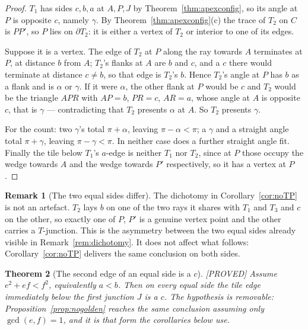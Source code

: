 \documentclass[11pt,reqno]{amsart}
\theoremstyle{plain}
\newtheorem{theorem}{Theorem}
\theoremstyle{definition}
\newtheorem{remark}[theorem]{Remark}
\newcommand{\lab}[1]{\hfill\textnormal{\footnotesize\textsc{[#1]}}}
\begin{document}
\begin{proof}
$T_1$ has sides $c,b,a$ at $A,P,J$ by Theorem~\ref{thm:apexconfig}, so its angle at $P$ is opposite
$c$, namely $\gamma$. By Theorem~\ref{thm:apexconfig}(c) the trace of $T_2$ on $C$ is $PP'$, so $P$
lies on $\partial T_2$: it is either a vertex of $T_2$ or interior to one of its edges.

Suppose it is a vertex. The edge of $T_2$ at $P$ along the ray towards $A$ terminates at $P$, at
distance $b$ from $A$; $T_2$'s flanks at $A$ are $b$ and $c$, and a $c$ there would terminate at
distance $c\ne b$, so that edge is $T_2$'s $b$. Hence $T_2$'s angle at $P$ has $b$ as a flank and is
$\alpha$ or $\gamma$. If it were $\alpha$, the other flank at $P$ would be $c$ and $T_2$ would be the
triangle $APR$ with $AP=b$, $PR=c$, $AR=a$, whose angle at $A$ is opposite $c$, that is $\gamma$ ---
contradicting that $T_2$ presents $\alpha$ at $A$. So $T_2$ presents $\gamma$.

For the count: two $\gamma$'s total $\pi+\alpha$, leaving $\pi-\alpha<\pi$; a $\gamma$ and a straight
angle total $\pi+\gamma$, leaving $\pi-\gamma<\pi$. In neither case does a further straight angle fit.
Finally the tile below $T_1$'s $a$-edge is neither $T_1$ nor $T_2$, since at $P$ those occupy the
wedge towards $A$ and the wedge towards $P'$ respectively, so it has a vertex at $P$.
\end{proof}

\begin{remark}[The two equal sides differ]\label{rem:twosides}
The dichotomy in Corollary~\ref{cor:noTP} is not an artefact. $T_2$ lays $b$ on one of the two rays it
shares with $T_1$ and $T_3$ and $c$ on the other, so exactly one of $P$, $P'$ is a genuine vertex
point and the other carries a $T$-junction. This is the asymmetry between the two equal sides already
visible in Remark~\ref{rem:dichotomy}. It does not affect what follows: Corollary~\ref{cor:noTP}
delivers the same conclusion on both sides.
\end{remark}

\begin{theorem}[The second edge of an equal side is a $c$]\label{thm:secondc}\lab{PROVED}
Assume $e^{2}+ef<f^{2}$, equivalently $a<b$. Then on every equal side the tile edge immediately below
the first junction $J$ is a $c$. \emph{The hypothesis is removable}: Proposition~\ref{prop:nogolden}
reaches the same conclusion assuming only $\gcd(e,f)=1$, and it is that form the corollaries below use.
\end{theorem}
\end{document}
